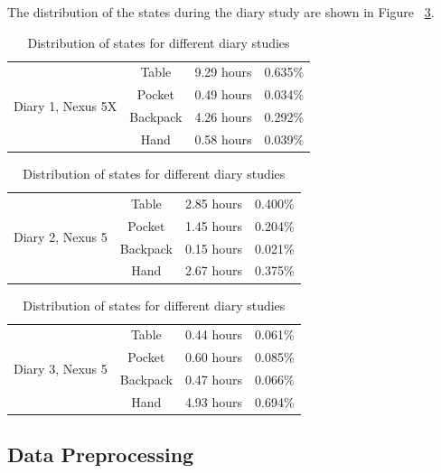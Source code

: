The distribution of the states during the diary study are shown in Figure ~\ref{tab:diarydistr}.


\begin{table}[h]
\caption{Distribution of states for different diary studies} \label{tab:diarydistr} 
\centering

\begin{tabular}{ |c|c|c|c| } 
 \hline
 \multirow{4}{*}{Diary 1, Nexus 5X} &
 Table & 9.29 hours & 0.635\%  \\ 
 & Pocket & 0.49 hours & 0.034\% \\ 
 & Backpack &  4.26 hours  &  0.292\% \\ 
 & Hand & 0.58 hours  & 0.039\% \\
 \hline
\end{tabular}

\bigskip

\begin{tabular}{ |c|c|c|c| } 
 \hline
 \multirow{4}{*}{Diary 2, Nexus 5} &
 Table & 2.85 hours & 0.400\%  \\ 
 & Pocket & 1.45 hours & 0.204\% \\ 
 & Backpack &  0.15 hours  &  0.021\% \\ 
 & Hand & 2.67 hours  & 0.375\% \\
 \hline
\end{tabular}

\bigskip

\begin{tabular}{ |c|c|c|c| } 
 \hline
 \multirow{4}{*}{Diary 3, Nexus 5} &
 Table & 0.44 hours & 0.061\%  \\ 
 & Pocket & 0.60 hours & 0.085\% \\ 
 & Backpack &  0.47 hours &  0.066\% \\ 
 & Hand & 4.93 hours  & 0.694\% \\
 \hline
\end{tabular}
\end{table}

\subsection{Data Preprocessing}
